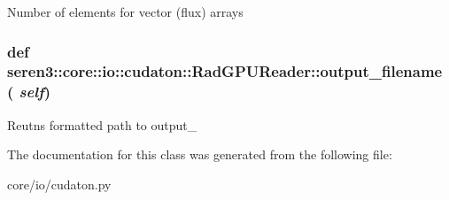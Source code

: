 \label{classseren3_1_1core_1_1io_1_1cudaton_1_1RadGPUReader_a6578f04222601eeb3b8367c97ee730fe}
\begin{DoxyVerb}
Number of elements for vector (flux) arrays
\end{DoxyVerb}
 \hypertarget{classseren3_1_1core_1_1io_1_1cudaton_1_1RadGPUReader_abf574508a4fddfee08cd8c598c5673ae}{
\subsubsection[{output\_\-filename}]{\setlength{\rightskip}{0pt plus 5cm}def seren3::core::io::cudaton::RadGPUReader::output\_\-filename ( {\em self})}}
\label{classseren3_1_1core_1_1io_1_1cudaton_1_1RadGPUReader_abf574508a4fddfee08cd8c598c5673ae}
\begin{DoxyVerb}
Reutns formatted path to output_%
\end{DoxyVerb}
 

The documentation for this class was generated from the following file:\begin{DoxyCompactItemize}
\item 
core/io/cudaton.py\end{DoxyCompactItemize}
